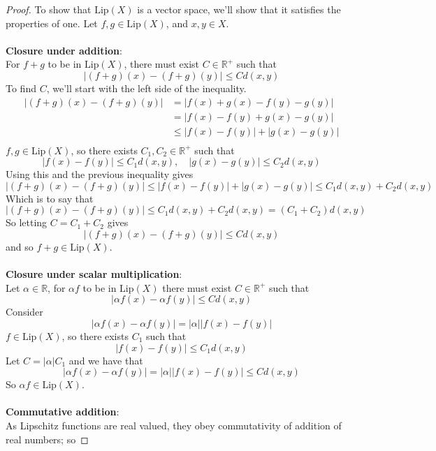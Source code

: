 \documentclass{article}
\newcommand{\abs}[1]{\left|#1\right|}
\newcommand{\parens}[1]{\left(#1\right)}
\newcommand{\R}{\mathbb{R}}
\newcommand{\lip}[1]{\text{Lip}\parens{#1}}
\begin{document}
        \begin{proof}
        To show that $\lip{X}$ is a vector space, we'll show
        that it satisfies the properties of one. Let $f,g \in 
        \lip{X}$, and $x,y \in X$.\\\\
        \textbf{Closure under addition}:\\
        For $f + g$ to be in $\lip{X}$, there must exist $C \in 
        \R^+$ such that
        $$\abs{(f+g)(x) - (f+g)(y)} \leq Cd(x,y)$$
        To find $C$, we'll start with the left side of the 
        inequality.
        \begin{align*}
        \abs{(f+g)(x) - (f+g)(y)} &= \abs{f(x) + g(x) - f(y)-g(y)} \\
        &= \abs{f(x) - f(y) + g(x) - g(y)} \\
        &\leq \abs{f(x) - f(y)} + \abs{g(x) - g(y)} \\
        \end{align*}
        $f, g \in \lip{X}$, so there exists $C_1, C_2 \in\R^+$ 
        such that
        $$\abs{f(x) - f(y)} \leq C_1d(x,y),\quad 
        \abs{g(x) - g(y)} \leq C_2d(x,y)$$
        Using this and the previous inequality gives
        $$\abs{(f+g)(x) - (f+g)(y)} \leq \abs{f(x) - f(y)} +
        \abs{g(x) - g(y)} \leq C_1d(x,y) + C_2d(x,y)$$
        Which is to say that
        $$\abs{(f+g)(x) - (f+g)(y)} \leq C_1d(x,y) + C_2d(x,y) = 
        \parens{C_1 + C_2}d(x,y)$$
        So letting $C = C_1 + C_2$ gives
        $$\abs{(f+g)(x) - (f+g)(y)} \leq Cd(x,y)$$ 
        and so $f+g \in \lip{X}$.\\\\
        \textbf{Closure under scalar multiplication}:\\
        Let $\alpha \in \R$, for $\alpha f$ to be in $\lip{X}$
        there must exist $C \in \R^+$ such that
        $$\abs{\alpha f(x) - \alpha f(y)} \leq Cd(x,y)$$ 
        Consider
        $$\abs{\alpha f(x) - \alpha f(y)} = \abs{\alpha}
        \abs{f(x) - f(y)}$$
        $f \in \lip{X}$, so there exists $C_1$ such that
        $$\abs{f(x) - f(y)} \leq C_1d(x,y)$$
        Let $C = \abs{\alpha}C_1$ and we have that 
        $$\abs{\alpha f(x) - \alpha f(y)} = \abs{\alpha}
        \abs{f(x) - f(y)} \leq Cd(x,y)$$
        So $\alpha f \in \lip{X}$.\\\\
        \textbf{Commutative addition}:\\
        As Lipschitz functions are real valued, they obey 
        commutativity of addition of real numbers; so

\end{proof}
\end{document}
